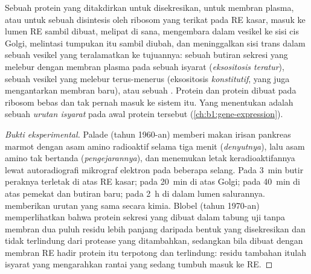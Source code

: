 \begin{proposition}\label{prop:b1:eukaryotic-cell:secretory}
Sebuah protein yang ditakdirkan untuk disekresikan, untuk membran
plasma, atau untuk sebuah  disintesis oleh ribosom yang terikat
pada RE kasar, masuk ke lumen RE sambil dibuat, melipat di sana,
mengembara dalam vesikel ke sisi cis Golgi, melintasi tumpukan itu
sambil diubah, dan meninggalkan sisi trans dalam sebuah vesikel yang
teralamatkan ke tujuannya: sebuah butiran sekresi yang melebur dengan
membran plasma pada sebuah isyarat (\emph{eksositosis
teratur}), sebuah vesikel yang melebur terus-menerus
(eksositosis \emph{konstitutif}, yang juga mengantarkan membran baru),
atau sebuah . Protein  dan protein  dibuat pada
ribosom bebas dan tak pernah masuk ke sistem itu. Yang menentukan adalah
sebuah \emph{urutan isyarat} pada awal protein
tersebut (\cref{ch:b1:gene-expression}).
\end{proposition}
\begin{proof}[Bukti eksperimental]
Palade (tahun 1960-an) memberi makan irisan pankreas marmot dengan asam
amino radioaktif selama tiga menit (\emph{denyutnya}), lalu asam amino tak
bertanda (\emph{pengejarannya}), dan menemukan letak keradioaktifannya
lewat autoradiografi mikrograf elektron pada beberapa selang. Pada
\qty{3}{min} butir peraknya terletak di atas RE kasar; pada
\qty{20}{min} di atas Golgi; pada \qty{40}{min} di atas 
pemekat dan butiran baru; pada \qty{2}{h} di dalam lumen salurannya.
 memberikan urutan yang sama secara kimia. Blobel (tahun
1970-an) memperlihatkan bahwa protein sekresi yang dibuat dalam tabung
uji tanpa membran dua puluh residu lebih panjang daripada bentuk yang
disekresikan dan tidak terlindung dari protease yang ditambahkan,
sedangkan bila dibuat dengan membran RE hadir protein itu terpotong dan
terlindung: residu tambahan itulah isyarat yang mengarahkan rantai yang
sedang tumbuh masuk ke RE.
\end{proof}

